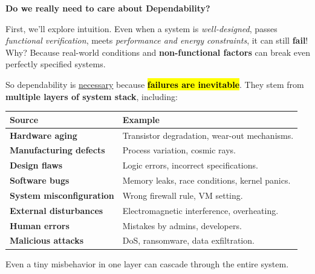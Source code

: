 \highspace
\begin{flushleft}
    \textcolor{Green3}{ \textbf{Do we really need to care about Dependability?}}
\end{flushleft}
First, we'll explore intuition. Even when a system is \emph{well-designed}, passes \emph{functional verification}, meets \emph{performance and energy constraints}, it can still \textbf{fail}! Why? Because real-world conditions and \textbf{non-functional factors} can break even perfectly specified systems.

\highspace
So dependability is \underline{necessary} because \hl{\textbf{failures are inevitable}}. They stem from \textbf{multiple layers of system stack}, including:

\begin{table}[!htp]
    \centering
    \begin{tabular}{@{} l | l @{}}
        \toprule
        \textbf{Source} & \textbf{Example} \\
        \midrule
        \textbf{Hardware aging}             & Transistor degradation, wear-out mechanisms.  \\ [.5em]
        \textbf{Manufacturing defects}      & Process variation, cosmic rays.               \\ [.5em]
        \textbf{Design flaws}               & Logic errors, incorrect specifications.       \\ [.5em]
        \textbf{Software bugs}              & Memory leaks, race conditions, kernel panics. \\ [.5em]
        \textbf{System misconfiguration}    & Wrong firewall rule, VM setting.              \\ [.5em]
        \textbf{External disturbances}      & Electromagnetic interference, overheating.    \\ [.5em]
        \textbf{Human errors}               & Mistakes by admins, developers.               \\ [.5em]
        \textbf{Malicious attacks}          & DoS, ransomware, data exfiltration.           \\
        \bottomrule
    \end{tabular}
\end{table}

\noindent
Even a tiny misbehavior in one layer can cascade through the entire system.

